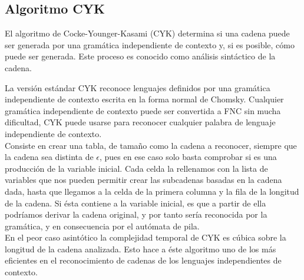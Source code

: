 \documentclass[12pt,a4paper,spanish]{book}
\begin{document}
\subsection{Algoritmo CYK\\}
El algoritmo de Cocke-Younger-Kasami (CYK) determina si una cadena puede ser generada por una gram\'atica independiente de contexto y, si es posible, c\'omo puede ser generada. Este proceso es conocido como an\'alisis sint\'actico de la cadena. 

La versi\'on est\'andar CYK reconoce lenguajes definidos por una gram\'atica independiente de contexto escrita en la forma normal de Chomsky. Cualquier gram\'atica independiente de contexto puede ser convertida a FNC sin mucha dificultad, CYK puede usarse para reconocer cualquier palabra de lenguaje independiente de contexto.\\

Consiste en crear una tabla, de tama\~{n}o como la cadena a reconocer, siempre que la cadena sea distinta de $\epsilon$, pues en ese caso solo basta comprobar si es una producci\'on de la variable inicial. Cada celda la rellenamos con la lista de variables que nos pueden permitir crear las subcadenas basadas en la cadena dada, hasta que llegamos a la celda de la primera columna y la fila de la longitud de la cadena. Si \'esta contiene a la variable inicial, es que a partir de ella podr\'iamos derivar la cadena original, y por tanto ser\'ia reconocida por la gram\'atica, y en consecuencia por el aut\'omata de pila.\\

En el peor caso asint\'otico la complejidad temporal de CYK es c\'ubica sobre la longitud de la cadena analizada. Esto hace a \'este algoritmo uno de los m\'as eficientes en el reconocimiento de cadenas de los lenguajes independientes de contexto.\\ \newline \newline
\end{document}
